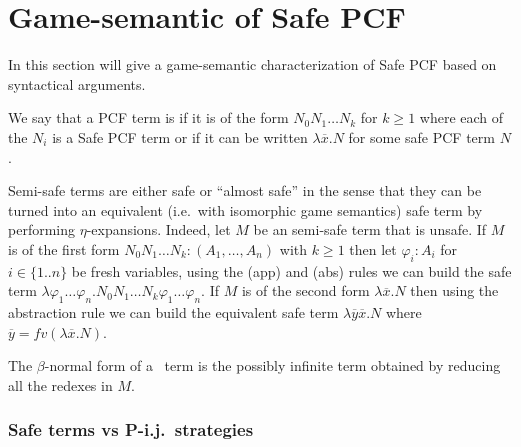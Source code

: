 

\section{Game-semantic of Safe PCF}
In this section will give a game-semantic characterization of Safe
PCF based on syntactical arguments.

\begin{definition}
We say that a PCF term is  if it is of the form
$N_0 N_1 \ldots N_k$ for $k\geq 1$ where each of the $N_i$ is a Safe
PCF term or if it can be written $\lambda \overline{x} . N$ for some
safe PCF term $N$.
\end{definition}
Semi-safe terms are either safe or ``almost safe'' in the sense that
they can be turned into an equivalent (i.e.~with isomorphic game
semantics) safe term  by performing $\eta$-expansions. Indeed, let
$M$ be an semi-safe term that is unsafe. If $M$ is of the first form
$N_0 N_1 \ldots N_k : (A_1,\ldots,A_n)$ with $k\geq 1$ then let
$\varphi_i:A_i$ for $i\in\{1..n\}$ be fresh variables, using the
(app) and (abs) rules we can build the safe term $\lambda \varphi_1
\ldots \varphi_n . N_0 N_1 \ldots N_k \varphi_1 \ldots \varphi_n$.
If $M$ is of the second form $\lambda \overline{x} . N$ then using
the abstraction rule we can build the equivalent safe term $\lambda
\overline{y} \overline{x}. N$  where $\overline{y} = fv(\lambda
\overline{x}. N)$.

The $\beta$-normal form of a \pcf\ term is the possibly infinite
term obtained by reducing all the redexes in $M$.

\subsubsection{Safe terms vs P-i.j.\ strategies}

